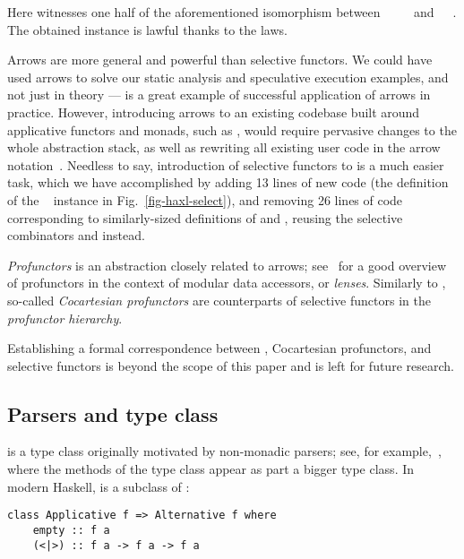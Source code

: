 \noindent
Here  witnesses one half of the aforementioned isomorphism between
~\hs{()}~\hs{(}~\hs{->}~ and~~~. The
obtained  instance is lawful thanks to the  laws.

Arrows are more general and powerful than selective functors. We could have used
arrows to solve our static analysis and speculative execution examples, and not
just in theory --- \Dune is a great example of successful application of arrows
in practice. However, introducing arrows to an existing codebase built around
applicative functors and monads, such as \Haxl, would require pervasive changes
to the whole abstraction stack, as well as rewriting all existing \Haxl user
code in the arrow notation~\citep{paterson2001new}. Needless to say,
introduction of selective functors to \Haxl is a much easier task, which we have
accomplished by adding 13 lines of new code (the definition of the
~ instance in Fig.~\ref{fig-haxl-select}), and removing
26 lines of code corresponding to similarly-sized definitions of  and
, reusing the selective combinators \hs{<||>} and \hs{<&&>} instead.

\emph{Profunctors} is an abstraction closely related to arrows;
see~\citep{pickering2017profunctor} for a good overview of profunctors in the
context of modular data accessors, or \emph{lenses}. Similarly to
, so-called \emph{Cocartesian profunctors} are counterparts of
selective functors in the \emph{profunctor hierarchy}.

Establishing a formal correspondence between , Cocartesian
profunctors, and selective functors is beyond the scope of this paper and is
left for future research.

\subsection{Parsers and  type class}\label{sec-alternative-functors}

 is a type class originally motivated by non-monadic parsers;
see, for example,~\citet{swierstra1996parsers}, where the methods of the
 type class appear as part a bigger  type class. In
modern Haskell,  is a subclass of :

\vspace{1mm}
\begin{verbatim}
class Applicative f => Alternative f where
    empty :: f a
    (<|>) :: f a -> f a -> f a
\end{verbatim}
\vspace{1mm}


